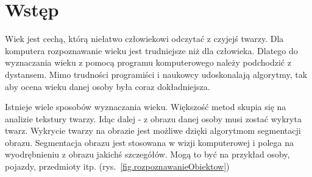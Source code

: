 \documentclass[a4paper,twoside,12pt]{book}
\newcounter{stronyPozaNumeracja}
\begin{document}
    \vfill




    \cleardoublepage


    \pagestyle{tylkoNumeryStron}
    \tableofcontents

    \setcounter{stronyPozaNumeracja}{\value{page}}
    \mainmatter
    \pagestyle{NumeryStronNazwyRozdzialow}


    \chapter{Wstęp}\label{ch:wstęp}

    Wiek jest cechą, którą niełatwo człowiekowi odczytać z czyjejś twarzy.
    Dla komputera rozpoznawanie wieku jest
    trudniejsze niż dla człowieka.
    Dlatego do wyznaczania wieku z pomocą programu komputerowego należy podchodzić z dystansem.
    Mimo trudności programiści
    i naukowcy udoskonalają algorytmy,
    tak aby ocena wieku danej osoby była coraz dokładniejsza.

    Istnieje wiele sposobów wyznaczania wieku.
    Większość metod skupia się na analizie tekstury twarzy.
    Idąc dalej - z obrazu danej osoby musi zostać wykryta twarz.
    Wykrycie twarzy na obrazie jest możliwe dzięki algorytmom segmentacji obrazu.
    Segmentacja obrazu jest stosowana w wizji komputerowej i polega na wyodrębnieniu z obrazu jakichś szczegółów.
    Mogą to być na przykład osoby, pojazdy, przedmioty itp. (rys.~\ref{fig.rozpoznawanieObiektow})
\end{document}
